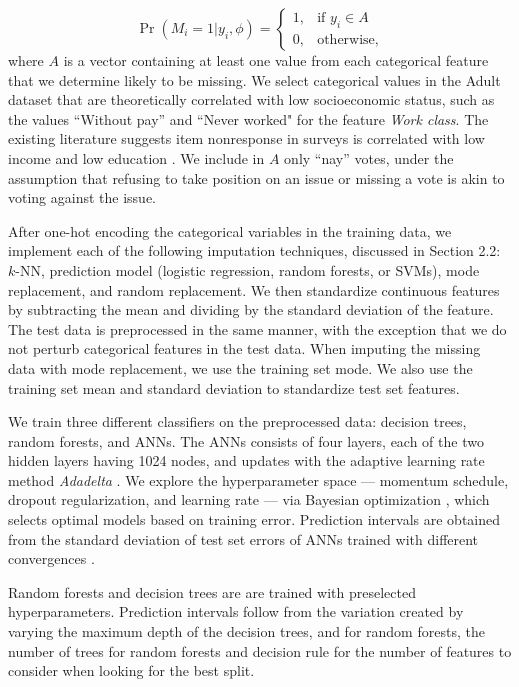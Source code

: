 \documentclass[10pt]{book}
\theoremstyle{definition}
\begin{document}
 \begin{equation}\label{3.1}
\Pr (M_i = 1 | y_i, \phi) = \begin{cases}
1, &\text{if $y_i \in A$}  \\
0, &\text{otherwise},
\end{cases}
\end{equation} where $A$ is a vector containing at least one value from each categorical feature that we determine likely to be missing. We select categorical values in the Adult dataset that are theoretically correlated with low socioeconomic status, such as the values ``Without pay'' and ``Never worked" for the feature \emph{Work class}. The existing literature suggests item nonresponse in surveys is correlated with low income and low education \citep{rubin1995}. We include in $A$ only ``nay'' votes, under the assumption that refusing to take position on an issue or missing a vote is akin to voting against the issue. 

After one-hot encoding the categorical variables in the training data, we implement each of the following imputation techniques, discussed in Section 2.2: $k$-NN, prediction model (logistic regression, random forests, or SVMs), mode replacement, and random replacement. We then standardize continuous features by subtracting the mean and dividing by the standard deviation of the feature. The test data is preprocessed in the same manner, with the exception that we do not perturb categorical features in the test data. When imputing the missing data with mode replacement, we use the training set mode. We also use the training set mean and standard deviation to standardize test set features.

\par
{}

We train three different classifiers on the preprocessed data: decision trees, random forests, and ANNs. The ANNs consists of four layers, each of the two hidden layers having 1024 nodes, and updates with the adaptive learning rate method \emph{Adadelta} \citep{zeiler2012}. We explore the hyperparameter space ---  momentum schedule, dropout regularization, and learning rate --- via Bayesian optimization \citep{snoek2012}, which selects optimal models based on training error. Prediction intervals are obtained from the standard deviation of test set errors of ANNs trained with different convergences \citep{heskes1997}. 

Random forests and decision trees are are trained with preselected hyperparameters. Prediction intervals follow from the variation created by varying the maximum depth of the decision trees, and for random forests, the number of trees for random forests and decision rule for the number of features to consider when looking for the best split. 
\end{document}
